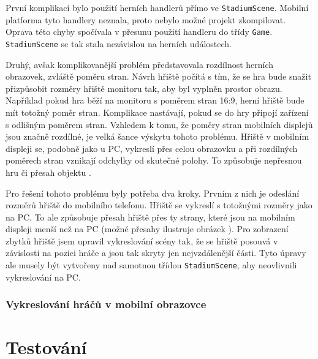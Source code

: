 \documentclass[thesis=B,czech,hidelinks]{FITthesis}[2012/06/26] %
\newcommand{\code}[1]{\texttt{#1}}
\begin{document}
První komplikací bylo použití herních handlerů přímo ve \code{StadiumScene}. Mobilní platforma tyto handlery neznala, proto nebylo možné projekt zkompilovat. Oprava této chyby spočívala v přesunu použití handleru do třídy \code{Game}. \code{StadiumScene} se tak stala nezávislou na herních událostech.

Druhý, avšak komplikovanější problém představovala rozdílnost herních obrazovek, zvláště poměru stran. Návrh hřiště počítá s tím, že se hra bude snažit přizpůsobit rozměry hřiště monitoru tak, aby byl vyplněn prostor obrazu. Například pokud hra běží na monitoru s poměrem stran 16:9, herní hřiště bude mít totožný poměr stran. Komplikace nastávají, pokud se do hry připojí zařízení s odlišným poměrem stran. Vzhledem k tomu, že poměry stran mobilních displejů jsou značně rozdílné, je velká šance výskytu tohoto problému. Hřiště v mobilním displeji se, podobně jako u PC, vykreslí přes celou obrazovku a při rozdílných poměrech stran vznikají odchylky od skutečné polohy. To způsobuje nepřesnou hru či přesah objektu .

Pro řešení tohoto problému byly potřeba dva kroky. Prvním z nich je odeslání rozměrů hřiště do mobilního telefonu. Hřiště se vykreslí s totožnými rozměry jako na PC. To ale způsobuje přesah hřiště přes ty strany, které jsou na mobilním displeji menší než na PC (možné přesahy ilustruje obrázek ). Pro zobrazení zbytků hřiště jsem upravil vykreslování scény tak, že se hřiště posouvá v závislosti na pozici hráče a jsou tak skryty jen nejvzdálenější části. Tyto úpravy ale musely být vytvořeny nad samotnou třídou \code{StadiumScene}, aby neovlivnili vykreslování na PC.

\subsubsection{Vykreslování hráčů v mobilní obrazovce}





\section{Testování}
\label{section:testing}
\end{document}
